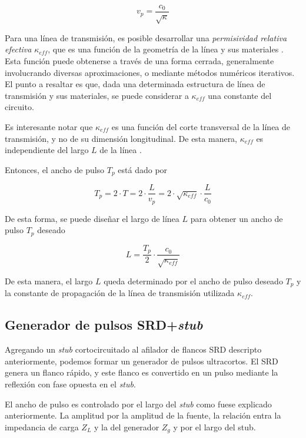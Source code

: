 \begin{equation}
  v_p = \frac{c_0}{\sqrt{\kappa}}
\end{equation}

Para una línea de transmisión, es posible desarrollar una \textit{permisividad
relativa efectiva} $\kappa_{eff}$, que es una función de la geometría de la
línea y sus materiales \cite{pozar2011}. Esta función puede obtenerse a través
de una forma cerrada, generalmente involucrando diversas aproximaciones, o
mediante métodos numéricos iterativos. El punto a resaltar es que, dada una
determinada estructura de línea de transmisión y sus materiales, se puede
considerar a $\kappa_{eff}$ una constante del circuito.

Es interesante notar que $\kappa_{eff}$ es una función del corte transversal de
la línea de transmisión, y no de su dimensión longitudinal. De esta manera,
$\kappa_{eff}$ es independiente del largo $L$ de la línea \cite{pozar2011}.

Entonces, el ancho de pulso $T_p$ está dado por

\begin{equation}
    T_p = 2 \cdot T = 2 \cdot \frac{L}{v_p} =2 \cdot \sqrt{\kappa_{eff}} \cdot \frac{L}{c_0}
\end{equation}

De esta forma, se puede diseñar el largo de línea $L$ para obtener un ancho de
pulso $T_p$ deseado

\begin{equation}
    \label{eq:stub_length_vs_delay}
    L = \frac{T_p}{2} \cdot \frac{c_0}{\sqrt{\kappa_{eff}}}
\end{equation}

De esta manera, el largo $L$ queda determinado por el ancho de pulso deseado
$T_p$ y la constante de propagación de la línea de transmisión utilizada
$\kappa_{eff}$.

\subsection{Generador de pulsos SRD+\textit{stub}}

Agregando un \textit{stub} cortocircuitado al afilador de flancos SRD
descripto anteriormente, podemos formar un generador de pulsos ultracortos. El
SRD genera un flanco rápido, y este flanco es convertido en un pulso
mediante la reflexión con fase opuesta en el \textit{stub}. 

El ancho de pulso es controlado por el largo del \textit{stub} como fuese
explicado anteriormente. La amplitud por la amplitud de la fuente, la relación
entra la impedancia de carga $Z_L$ y la del generador $Z_g$ y por el largo del
stub.

